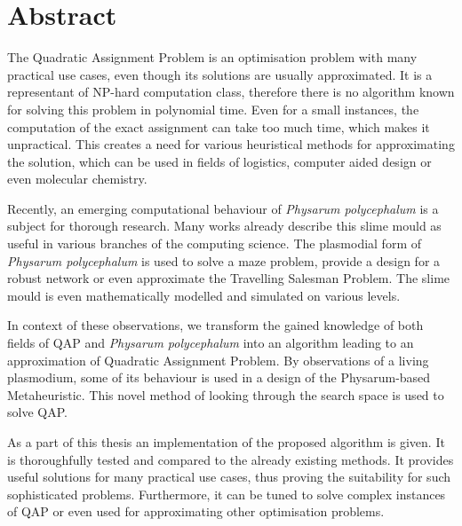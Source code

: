 \chapter*{Abstract}

The Quadratic Assignment Problem is an optimisation problem with many practical use cases, even though its solutions are usually approximated. It is a representant of NP-hard computation class, therefore there is no algorithm known for solving this problem in polynomial time. Even for a small instances, the computation of the exact assignment can take too much time, which makes it unpractical. This creates a need for various heuristical methods for approximating the solution, which can be used in fields of logistics, computer aided design or even molecular chemistry.

Recently, an emerging computational behaviour of \textit{Physarum polycephalum} is a subject for thorough research. Many works already describe this slime mould as useful in various branches of the computing science. The plasmodial form of \textit{Physarum polycephalum} is used to solve a maze problem, provide a design for a robust network or even approximate the Travelling Salesman Problem. The slime mould is even mathematically modelled and simulated on various levels.

In context of these observations, we transform the gained knowledge of both fields of QAP and \textit{Physarum polycephalum} into an algorithm leading to an approximation of Quadratic Assignment Problem. By observations of a living plasmodium, some of its behaviour is used in a design of the Physarum-based Metaheuristic. This novel method of looking through the search space is used to solve QAP.

As a part of this thesis an implementation of the proposed algorithm is given. It is thoroughfully tested and compared to the already existing methods. It provides useful solutions for many practical use cases, thus proving the suitability for such sophisticated problems. Furthermore, it can be tuned to solve complex instances of QAP or even used for approximating other optimisation problems.
